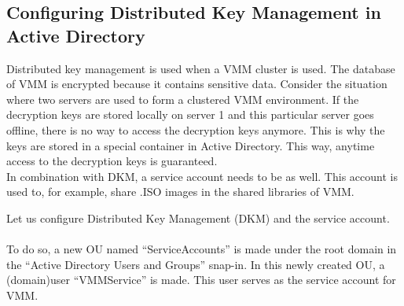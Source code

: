\subsection{Configuring Distributed Key Management in Active Directory}
Distributed key management is used when a VMM cluster is used. The database of VMM is encrypted because it contains sensitive data. Consider the situation where two servers are used to form a clustered VMM environment. If the decryption keys are stored locally on server 1 and this particular server goes offline, there is no way to access the decryption keys anymore. This is why the keys are stored in a special container in Active Directory. This way, anytime access to the decryption keys is guaranteed. \\
In combination with DKM, a service account needs to be as well. This account is used to, for example, share .ISO images in the shared libraries of VMM.

Let us configure Distributed Key Management (DKM) and the service account. \\ \\
To do so, a new OU named ``ServiceAccounts'' is made under the root domain in the ``Active Directory Users and Groups'' snap-in. In this newly created OU, a (domain)user ``VMMService'' is made. This user serves as the service account for VMM.


